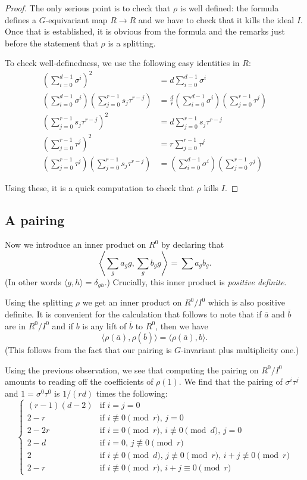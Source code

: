 \documentclass[reqno]{amsart}
\theoremstyle{definition}
\theoremstyle{remark}
\begin{document}
\begin{proof}
The only serious point is to check that $\rho$ is well
defined: the formula defines a $G$-equivariant map $R\to R$ and we
have to check that it kills the ideal $I$.  Once that is established,
it is obvious from the formula and the remarks just before the
statement that $\rho$ is a splitting.

To check well-definedness, we use the following easy identities in $R$:
\begin{align*}
\left(\sum_{i=0}^{d-1}\sigma^i\right)^2&=d \sum_{i=0}^{d-1}\sigma^i\\
\left(\sum_{i=0}^{d-1}\sigma^i\right)\left(\sum_{j=0}^{r-1}s_j\tau^{r-j}\right)
&=\frac dr \left(\sum_{i=0}^{d-1}\sigma^i\right)\left( \sum_{j=0}^{r-1}\tau^j\right)\\
\left(\sum_{j=0}^{r-1}s_j\tau^{r-j}\right)^2&=d \sum_{j=0}^{r-1}s_j\tau^{r-j}\\
\left(\sum_{j=0}^{r-1}\tau^j\right)^2&=r \sum_{j=0}^{r-1}\tau^j\\
\left(\sum_{j=0}^{r-1}\tau^j\right)\left(\sum_{j=0}^{r-1}s_j\tau^{r-j}\right)
&=\left(\sum_{i=0}^{d-1}\sigma^i\right)\left( \sum_{j=0}^{r-1}\tau^j\right)
\end{align*}

Using these, it is a quick computation to check that $\rho$ kills $I$.
\end{proof}

\subsection{A pairing}
Now we introduce an inner product on $R^0$ by declaring that
$$\left\langle\sum_g a_gg,\sum_gb_gg\right\rangle=\sum a_gb_g.$$
(In other words $\langle g,h\rangle=\delta_{gh}$.)
Crucially, this inner product is \emph{positive definite}.

Using the splitting $\rho$ we get an inner product on $R^0/I^0$ which
is also positive definite.  It is convenient for the calculation that
follows to note that if $\overline a$ and $\overline b$ are in $R^0/I^0$ and
if $b$ is any lift of $\overline b$ to $R^0$, then we have
$$\langle\rho(\overline a),\rho(\overline b)\rangle
=\langle\rho(\overline a),b\rangle.$$
(This follows from the fact that our pairing is $G$-invariant plus
multiplicity one.)

Using the previous observation, we see that computing the pairing on
$R^0/I^0$ amounts to reading off the coefficients of $\rho(1)$.  We
find that the pairing of $\sigma^i\tau^j$ and $1=\sigma^0\tau^0$ is
$1/(rd)$ times the following:
$$\begin{cases}
(r-1)(d-2)&\text{if $i=j=0$}\\
2-r&\text{if $i\not\equiv0\pmod r$, $j=0$}\\
2-2r&\text{if $i\equiv0\pmod r$, $i\not\equiv0\pmod d$, $j=0$}\\
2-d&\text{if $i=0$, $j\not\equiv0\pmod r$}\\
2&\text{if $i\not\equiv0\pmod d$, $j\not\equiv0\pmod r$, 
$i+j\not\equiv0\pmod r$}\\
2-r&\text{if $i\not\equiv0\pmod r$, $i+j\equiv0\pmod r$}
\end{cases}
$$
\end{document}
